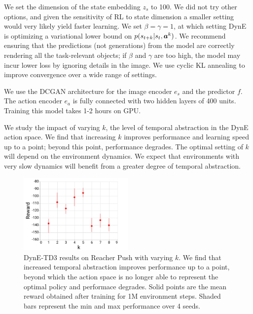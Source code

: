 \begin{subappendices}
We set the dimension of the state embedding $z_s$ to 100.
We did not try other options, and given the sensitivity of RL to state dimension a smaller setting would very likely yield faster learning.
We set $\beta = \gamma = 1$, at which setting DynE is optimizing a variational lower bound on $p(s_{t+k} | s_t, {\bm{a}}^k)$.
We recommend ensuring that the predictions (not generations) from the model are correctly rendering all the task-relevant objects; if $\beta$ and $\gamma$ are too high, the model may incur lower loss by ignoring details in the image.
We use cyclic KL annealing \citep{liu2019cyclical} to improve convergence over a wide range of settings.

We use the DCGAN architecture \citep{radford2015unsupervised} for the image encoder $e_s$ and the predictor $f$. The action encoder $e_a$ is fully connected with two hidden layers of 400 units. Training this model takes 1-2 hours on GPU.



\label{sec:varying_k}

We study the impact of varying $k$, the level of temporal abstraction in the DynE action space.
We find that increasing $k$ improves performance and learning speed up to a point; beyond this point, performance degrades.
The optimal setting of $k$ will depend on the environment dynamics.
We expect that environments with very slow dynamics will benefit from a greater degree of temporal abstraction.


\begin{figure}[h]
\centering
\includegraphics[width=0.5\textwidth]{figures/dyne/varying_k_RP.pdf}
\caption{DynE-TD3 results on Reacher Push with varying $k$.
We find that increased temporal abstraction improves performance up to a point, beyond which the action space is no longer able to represent the optimal policy and performace degrades.
Solid points are the mean reward obtained after training for 1M environment steps. Shaded bars represent the min and max performance over 4 seeds.}
\label{fig:varying_k}
\end{figure}






\end{subappendices}
